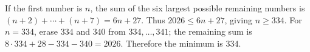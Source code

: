 If the first number is $n$, the sum of the six largest possible remaining numbers is $(n+2)+\cdots+(n+7)=6n+27$. Thus $2026\le6n+27$, giving $n\ge334$. For $n=334$, erase $334$ and $340$ from $334,\ldots,341$; the remaining sum is $8\cdot334+28-334-340=2026$. Therefore the minimum is $\boxed{334}$.
